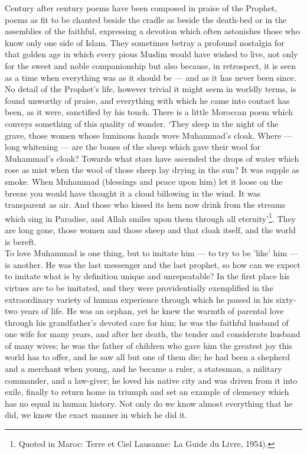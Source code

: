 \documentclass[10pt, twoside]{book}
\begin{document}
Century after century poems have been composed in praise of the Prophet, poems as fit to be chanted 
beside the cradle as beside the death\hyp{}bed or in the assemblies of the faithful, expressing a devotion 
which often astonishes those who know only one side of Islam. They sometimes betray a profound 
nostalgia for that golden age in which every pious Muslim would have wished to live, not only for the 
sweet and noble companionship but also because, in retrospect, it is seen as a time when everything 
was as it should be --- and as it has never been since. No detail of the Prophet's life, however 
trivial it might seem in worldly terms, is found unworthy of praise, and everything with which he 
came into contact has been, as it were, sanctified by his touch. There is a little Moroccan poem 
which conveys something of this quality of wonder. `They sleep in the night of the grave, those women 
whose luminous hands wove Muhammad's cloak. Where --- long whitening --- are the bones of the sheep which gave their wool for Muhammad's cloak? Towards what stars have ascended the drops of water which rose as mist when the wool of those sheep lay drying in the sun? It was supple as smoke. When Muhammad (blessings and peace upon him) let it loose on the breeze you would have thought it a cloud billowing in the wind. It was transparent as air. And those who kissed its hem now drink from the streams which sing in Paradise, and Allah smiles upon them through all eternity'\footnote{Quoted in Maroc: Terre et Ciel Lausanne: La Guide du Livre, 1954).}. They are long gone, those women and those sheep and that cloak itself, and the world is bereft. \\

To love Muhammad is one thing, but to imitate him --- to try to be 'like' him --- is another. He was the 
last messenger and the last prophet, so how can we expect to imitate what is by definition unique and 
unrepeatable? In the first place his virtues are to be imitated, and they were providentially 
exemplified in the extraordinary variety of human experience through which he passed in his sixty\hyp{}two 
years of life. He was an orphan, yet he knew the warmth of parental love through his grandfather's 
devoted care for him; he was the faithful husband of one wife for many years, and after her death, 
the tender and considerate husband of many wives; he was the father of children who gave him the 
greatest joy this world has to offer, and he saw all but one of them die; he had been a shepherd and 
a merchant when young, and he became a ruler, a statesman, a military commander, and a law\hyp{}giver; he 
loved his native city and was driven from it into exile, finally to return home in triumph and set an 
example of clemency which has no equal in human history. Not only do we know almost everything that 
he did, we know the exact manner in which he did it. \\
\end{document}
